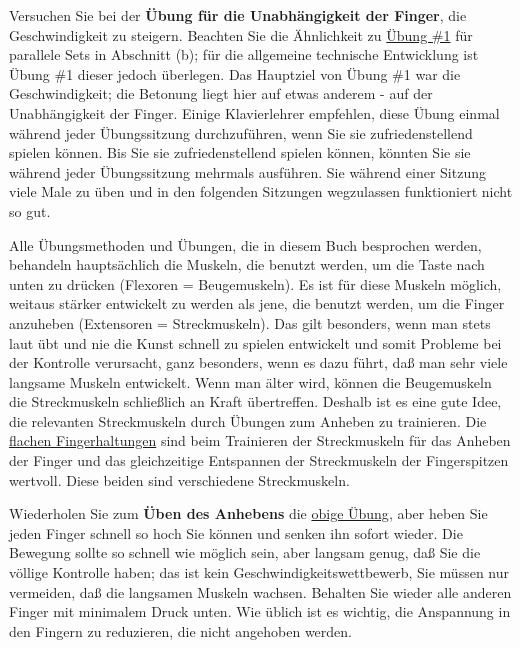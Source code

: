 Versuchen Sie bei der \textbf{Übung für die Unabhängigkeit der Finger}, die Geschwindigkeit zu steigern.
Beachten Sie die Ähnlichkeit zu \hyperlink{c1iii7b1}{Übung \#1} für parallele Sets in Abschnitt (b); für die allgemeine technische Entwicklung ist Übung \#1 dieser jedoch überlegen.
Das Hauptziel von Übung \#1 war die Geschwindigkeit; die Betonung liegt hier auf etwas anderem - auf der Unabhängigkeit der Finger.
Einige Klavierlehrer empfehlen, diese Übung einmal während jeder Übungssitzung durchzuführen, wenn Sie sie zufriedenstellend spielen können.
Bis Sie sie zufriedenstellend spielen können, könnten Sie sie während jeder Übungssitzung mehrmals ausführen.
Sie während einer Sitzung viele Male zu üben und in den folgenden Sitzungen wegzulassen funktioniert nicht so gut.

Alle Übungsmethoden und Übungen, die in diesem Buch besprochen werden, behandeln hauptsächlich die Muskeln, die benutzt werden, um die Taste nach unten zu drücken (Flexoren = Beugemuskeln).
Es ist für diese Muskeln möglich, weitaus stärker entwickelt zu werden als jene, die benutzt werden, um die Finger anzuheben (Extensoren = Streckmuskeln).
Das gilt besonders, wenn man stets laut übt und nie die Kunst schnell zu spielen entwickelt und somit Probleme bei der Kontrolle verursacht, ganz besonders, wenn es dazu führt, daß man sehr viele langsame Muskeln entwickelt.
Wenn man älter wird, können die Beugemuskeln die Streckmuskeln schließlich an Kraft übertreffen.
Deshalb ist es eine gute Idee, die relevanten Streckmuskeln durch Übungen zum Anheben zu trainieren.
Die \hyperlink{c1iii4b}{flachen Fingerhaltungen} sind beim Trainieren der Streckmuskeln für das Anheben der Finger und das gleichzeitige Entspannen der Streckmuskeln der Fingerspitzen wertvoll.
Diese beiden sind verschiedene Streckmuskeln.


\hypertarget{c1iii7anheben}{}

Wiederholen Sie zum \textbf{Üben des Anhebens} die \hyperlink{c1iii7finger}{obige Übung}, aber heben Sie jeden Finger schnell so hoch Sie können und senken ihn sofort wieder.
Die Bewegung sollte so schnell wie möglich sein, aber langsam genug, daß Sie die völlige Kontrolle haben; das ist kein Geschwindigkeitswettbewerb, Sie müssen nur vermeiden, daß die langsamen Muskeln wachsen.
Behalten Sie wieder alle anderen Finger mit minimalem Druck unten.
Wie üblich ist es wichtig, die Anspannung in den Fingern zu reduzieren, die nicht angehoben werden.

